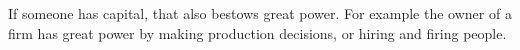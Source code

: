 If someone has capital, that also bestows great power.
For example the owner of a firm has great power by making production decisions, or hiring and firing people.